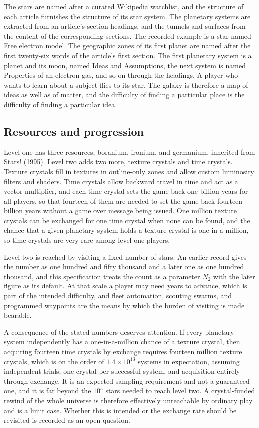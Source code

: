 \documentclass[11pt]{article}
\begin{document}
The stars are named after a curated Wikipedia watchlist, and the structure of each article furnishes the structure of its star system. The planetary systems are extracted from an article's section headings, and the tunnels and surfaces from the content of the corresponding sections. The recorded example is a star named Free electron model. The geographic zones of its first planet are named after the first twenty-six words of the article's first section. The first planetary system is a planet and its moon, named Ideas and Assumptions, the next system is named Properties of an electron gas, and so on through the headings. A player who wants to learn about a subject flies to its star. The galaxy is therefore a map of ideas as well as of matter, and the difficulty of finding a particular place is the difficulty of finding a particular idea.

\subsection{Resources and progression}

Level one has three resources, boranium, ironium, and germanium, inherited from Stars! (1995). Level two adds two more, texture crystals and time crystals. Texture crystals fill in textures in outline-only zones and allow custom luminosity filters and shaders. Time crystals allow backward travel in time and act as a vector multiplier, and each time crystal sets the game back one billion years for all players, so that fourteen of them are needed to set the game back fourteen billion years without a game over message being issued. One million texture crystals can be exchanged for one time crystal when none can be found, and the chance that a given planetary system holds a texture crystal is one in a million, so time crystals are very rare among level-one players.

Level two is reached by visiting a fixed number of stars. An earlier record gives the number as one hundred and fifty thousand and a later one as one hundred thousand, and this specification treats the count as a parameter $N_2$ with the later figure as its default. At that scale a player may need years to advance, which is part of the intended difficulty, and fleet automation, scouting swarms, and programmed waypoints are the means by which the burden of visiting is made bearable.

A consequence of the stated numbers deserves attention. If every planetary system independently has a one-in-a-million chance of a texture crystal, then acquiring fourteen time crystals by exchange requires fourteen million texture crystals, which is on the order of $1.4 \times 10^{13}$ systems in expectation, assuming independent trials, one crystal per successful system, and acquisition entirely through exchange. It is an expected sampling requirement and not a guaranteed one, and it is far beyond the $10^5$ stars needed to reach level two. A crystal-funded rewind of the whole universe is therefore effectively unreachable by ordinary play and is a limit case. Whether this is intended or the exchange rate should be revisited is recorded as an open question.
\end{document}
